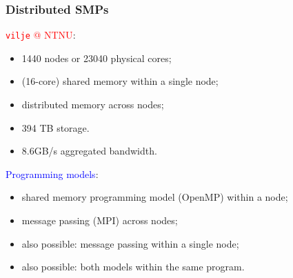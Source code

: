 \documentclass{beamer}
\begin{document}
\begin{frame}\frametitle{Distributed SMPs}
\textcolor{red}{\texttt{vilje} @ NTNU}: 
\vspace{.2cm}
\begin{itemize}
  \item 1440 nodes or 23040 physical cores; 
  \item (16-core) shared memory within a single node; 
  \item distributed memory across nodes; 
  \item 394 TB storage.
  \item 8.6GB/s aggregated bandwidth.
  \end{itemize}
  \vspace{.5cm}
  \textcolor{blue}{Programming models}: 
  \begin{itemize}
  \item shared memory programming model (OpenMP) within a node;
  \item message passing (MPI) across nodes; 
  \vspace{.2cm}
  \item also possible: message passing within a single node; 
  \item also possible: both models within the same program.
  \end{itemize}
\end{frame}
\end{document}
